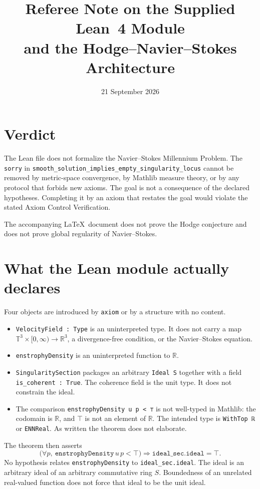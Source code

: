 \documentclass[11pt,a4paper]{article}
\title{Referee Note on the Supplied Lean~4 Module\\
and the Hodge--Navier--Stokes Architecture}
\author{}
\date{21 September 2026}
\theoremstyle{definition}
\theoremstyle{remark}
\newcommand{\R}{\mathbb{R}}
\newcommand{\T}{\mathbb{T}}
\begin{document}
\maketitle

\section{Verdict}

The Lean file does not formalize the Navier--Stokes Millennium Problem. The \texttt{sorry} in \texttt{smooth\_solution\_implies\_empty\_singularity\_locus} cannot be removed by metric-space convergence, by Mathlib measure theory, or by any protocol that forbids new axioms. The goal is not a consequence of the declared hypotheses. Completing it by an axiom that restates the goal would violate the stated Axiom Control Verification.

The accompanying \LaTeX\ document does not prove the Hodge conjecture and does not prove global regularity of Navier--Stokes.

\section{What the Lean module actually declares}

Four objects are introduced by \texttt{axiom} or by a structure with no content.

\begin{itemize}[leftmargin=1.4em]
\item \texttt{VelocityField : Type} is an uninterpreted type. It does not carry a map $\T^3\times[0,\infty)\to\R^3$, a divergence-free condition, or the Navier--Stokes equation.
\item \texttt{enstrophyDensity} is an uninterpreted function to $\R$.
\item \texttt{SingularitySection} packages an arbitrary \texttt{Ideal S} together with a field \texttt{is\_coherent : True}. The coherence field is the unit type. It does not constrain the ideal.
\item The comparison \texttt{enstrophyDensity u p < ⊤} is not well-typed in Mathlib: the codomain is $\R$, and $\top$ is not an element of $\R$. The intended type is \texttt{WithTop ℝ} or \texttt{ENNReal}. As written the theorem does not elaborate.
\end{itemize}

The theorem then asserts
\[
\bigl(\forall p,\ \texttt{enstrophyDensity}\,u\,p < \top\bigr)
\Longrightarrow
\texttt{ideal\_sec.ideal}=\top.
\]
No hypothesis relates \texttt{enstrophyDensity} to \texttt{ideal\_sec.ideal}. The ideal is an arbitrary ideal of an arbitrary commutative ring $S$. Boundedness of an unrelated real-valued function does not force that ideal to be the unit ideal.
\end{document}
